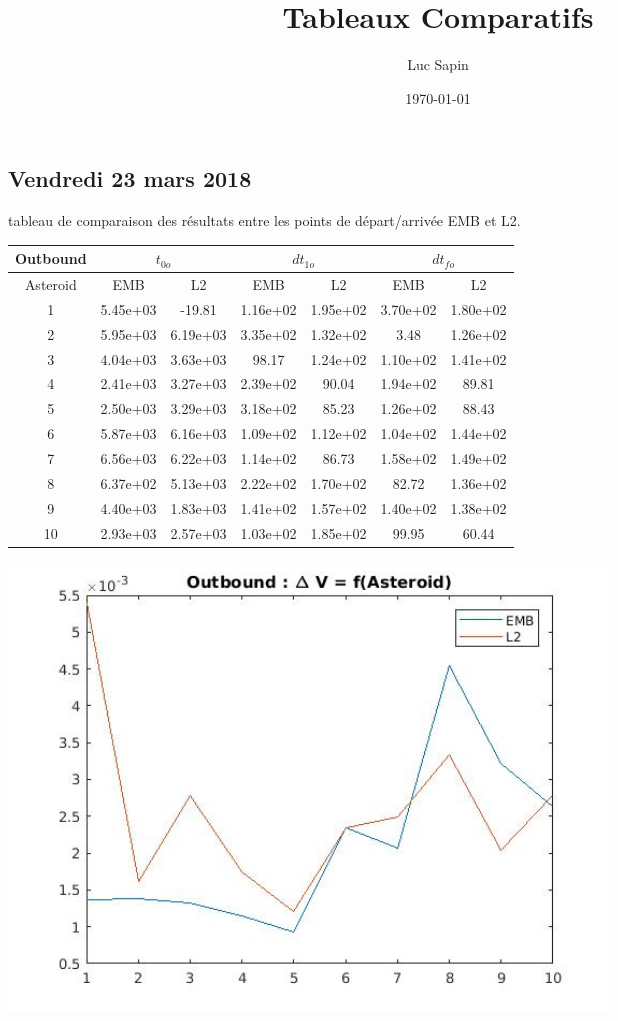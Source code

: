 \documentclass[fleqn,%
a4paper,11pt]{scrbook}
\title{Tableaux Comparatifs}
\author{Luc Sapin}
\date{\today}
\begin{document}
\maketitle
\chapter*{}
\label{cha:cr-reu}
\section*{Vendredi 23 mars 2018}
tableau de comparaison des résultats entre les points de départ/arrivée EMB et L2.\\


\begin{tabular}{|c||c|c||c|c||c|c|}
	\hline
	\textbf{Outbound} & \multicolumn{2}{c||}{$t_{0o}$} &  \multicolumn{2}{c||}{$dt_{1o}$} & \multicolumn{2}{c|}{$dt_{fo}$} \\
	\hline
	Asteroid & EMB & L2 & EMB & L2 & EMB & L2 \\
	\hline
	1 & 5.45e+03 & -19.81 & 1.16e+02 & 1.95e+02 & 3.70e+02 & 1.80e+02 \\
	\hline
	2 & 5.95e+03 & 6.19e+03 & 3.35e+02 & 1.32e+02 & 3.48 & 1.26e+02 \\
	\hline
	3 & 4.04e+03 & 3.63e+03 & 98.17 & 1.24e+02 & 1.10e+02 & 1.41e+02 \\
	\hline
	4 & 2.41e+03 & 3.27e+03 & 2.39e+02 & 90.04 & 1.94e+02 & 89.81 \\
	\hline
	5 & 2.50e+03 & 3.29e+03 & 3.18e+02 & 85.23 & 1.26e+02 & 88.43 \\
	\hline
	6 & 5.87e+03 & 6.16e+03 & 1.09e+02 & 1.12e+02 & 1.04e+02 & 1.44e+02 \\
	\hline
	7 & 6.56e+03 & 6.22e+03 & 1.14e+02 & 86.73 & 1.58e+02 & 1.49e+02 \\
	\hline
	8 & 6.37e+02 & 5.13e+03 & 2.22e+02 & 1.70e+02 & 82.72 & 1.36e+02 \\
	\hline
	9 & 4.40e+03 & 1.83e+03 & 1.41e+02 & 1.57e+02 & 1.40e+02 & 1.38e+02 \\
	\hline
	10 & 2.93e+03 & 2.57e+03 & 1.03e+02 & 1.85e+02 & 99.95 & 60.44 \\
	\hline
\end{tabular}

\includegraphics[width=0.7\textwidth]{OutboundDeltaV10Ast.jpg}
\caption{$\Delta V = f(Asteroid)$}
\end{document}
